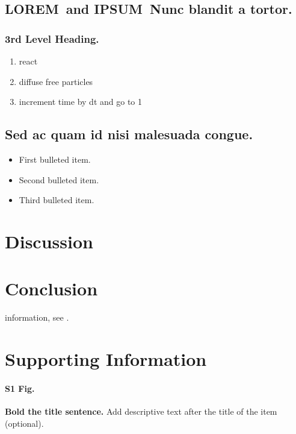 \documentclass[10pt,letterpaper]{article}
\newcommand{\lorem}{{\bf LOREM}}
\newcommand{\ipsum}{{\bf IPSUM}}
\begin{document}
\subsection*{\lorem\ and \ipsum\ Nunc blandit a tortor.}
\subsubsection*{3rd Level Heading.} 

\begin{enumerate}
	\item{react}
	\item{diffuse free particles}
	\item{increment time by dt and go to 1}
\end{enumerate}


\subsection*{Sed ac quam id nisi malesuada congue.}


\begin{itemize}
	\item First bulleted item.
	\item Second bulleted item.
	\item Third bulleted item.
\end{itemize}

\section*{Discussion}

\section*{Conclusion}

information, see .

\section*{Supporting Information}

\paragraph*{S1 Fig.}
\label{S1_Fig}
{\bf Bold the title sentence.} Add descriptive text after the title of the item
(optional).
\end{document}
